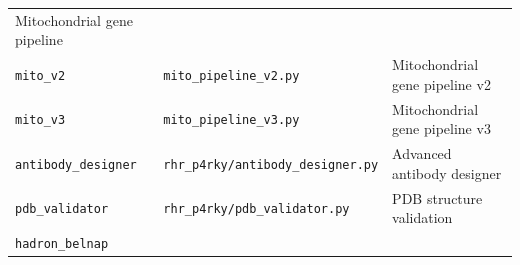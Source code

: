 \begin{longtable}[]{@{}lll@{}}
\begin{minipage}[t]{0.43\columnwidth}
Mitochondrial gene pipeline\strut
\end{minipage}\tabularnewline
\begin{minipage}[t]{0.24\columnwidth}\raggedright
\texttt{mito\_v2}\strut
\end{minipage} & \begin{minipage}[t]{0.24\columnwidth}\raggedright
\texttt{mito\_pipeline\_v2.py}\strut
\end{minipage} & \begin{minipage}[t]{0.43\columnwidth}\raggedright
Mitochondrial gene pipeline v2\strut
\end{minipage}\tabularnewline
\begin{minipage}[t]{0.24\columnwidth}\raggedright
\texttt{mito\_v3}\strut
\end{minipage} & \begin{minipage}[t]{0.24\columnwidth}\raggedright
\texttt{mito\_pipeline\_v3.py}\strut
\end{minipage} & \begin{minipage}[t]{0.43\columnwidth}\raggedright
Mitochondrial gene pipeline v3\strut
\end{minipage}\tabularnewline
\begin{minipage}[t]{0.24\columnwidth}\raggedright
\texttt{antibody\_designer}\strut
\end{minipage} & \begin{minipage}[t]{0.24\columnwidth}\raggedright
\texttt{rhr\_p4rky/antibody\_designer.py}\strut
\end{minipage} & \begin{minipage}[t]{0.43\columnwidth}\raggedright
Advanced antibody designer\strut
\end{minipage}\tabularnewline
\begin{minipage}[t]{0.24\columnwidth}\raggedright
\texttt{pdb\_validator}\strut
\end{minipage} & \begin{minipage}[t]{0.24\columnwidth}\raggedright
\texttt{rhr\_p4rky/pdb\_validator.py}\strut
\end{minipage} & \begin{minipage}[t]{0.43\columnwidth}\raggedright
PDB structure validation\strut
\end{minipage}\tabularnewline
\begin{minipage}[t]{0.24\columnwidth}\raggedright
\texttt{hadron\_belnap}\strut
\end{minipage} & \begin{minipage}[t]{0.24\columnwidth}\raggedright

\end{minipage}
\end{longtable}

